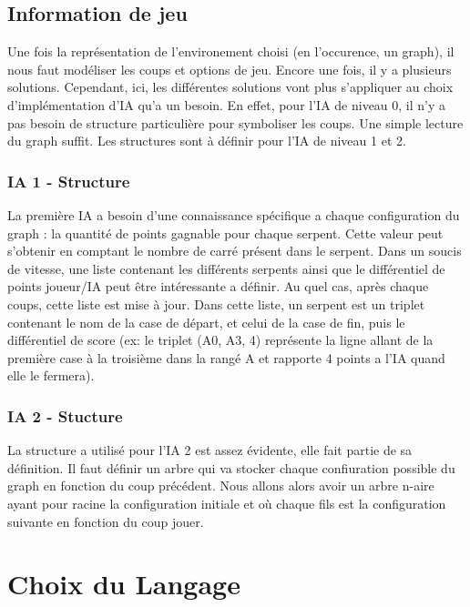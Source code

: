 \documentclass[a4paper,12pt]{report}
\begin{document}
\chapter{Information de jeu}

Une fois la repr\'esentation de l'environement choisi (en l'occurence, un graph), il nous faut mod\'eliser les coups et options de jeu. Encore une fois, il y a plusieurs solutions. Cependant, ici, les diff\'erentes solutions vont plus s'appliquer au choix d'impl\'ementation d'IA qu'a un besoin. En effet, pour l'IA de niveau 0, il n'y a pas besoin de structure particuli\`ere pour symboliser les coups. Une simple lecture du graph suffit. Les structures sont \`a d\'efinir pour l'IA de niveau 1 et 2. 

\section{IA 1 - Structure}

La premi\`ere IA a besoin d'une connaissance sp\'ecifique a chaque configuration du graph : la quantit\'e de points gagnable pour chaque serpent. Cette valeur peut s'obtenir en comptant le nombre de carr\'e pr\'esent dans le serpent. Dans un soucis de vitesse, une liste contenant les diff\'erents serpents ainsi que le diff\'erentiel de points joueur/IA peut \^etre int\'eressante a d\'efinir. Au quel cas, apr\`es chaque coups, cette liste est mise \`a jour. Dans cette liste, un serpent est un triplet contenant le nom de la case de d\'epart, et celui de la case de fin, puis le diff\'erentiel de score (ex: le triplet (A0, A3, 4) repr\'esente la ligne allant de la premi\`ere case \`a la troisi\`eme dans la rang\'e A et rapporte 4 points a l'IA quand elle le fermera).

\section{IA 2 - Stucture}

La structure a utilis\'e pour l'IA 2 est assez \'evidente, elle fait partie de sa d\'efinition. Il faut d\'efinir un arbre qui va stocker chaque confiuration possible du graph en fonction du coup pr\'ec\'edent. Nous allons alors avoir un arbre n-aire ayant pour racine la configuration initiale et o\`u chaque fils est la configuration suivante en fonction du coup jouer. 


\part{Choix du Langage}
\end{document}
